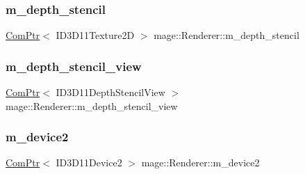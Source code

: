 \subsubsection{\texorpdfstring{m\+\_\+depth\+\_\+stencil}{m\_depth\_stencil}}
{\footnotesize\ttfamily \hyperlink{namespacemage_ae74f374780900893caa5555d1031fd79}{Com\+Ptr}$<$ I\+D3\+D11\+Texture2D $>$ mage\+::\+Renderer\+::m\+\_\+depth\+\_\+stencil\hspace{0.3cm}{\ttfamily [protected]}}

\hypertarget{classmage_1_1_renderer_aaeefc175b9a619f95229a3f8464a7924}{}\label{classmage_1_1_renderer_aaeefc175b9a619f95229a3f8464a7924} 
\subsubsection{\texorpdfstring{m\+\_\+depth\+\_\+stencil\+\_\+view}{m\_depth\_stencil\_view}}
{\footnotesize\ttfamily \hyperlink{namespacemage_ae74f374780900893caa5555d1031fd79}{Com\+Ptr}$<$ I\+D3\+D11\+Depth\+Stencil\+View $>$ mage\+::\+Renderer\+::m\+\_\+depth\+\_\+stencil\+\_\+view\hspace{0.3cm}{\ttfamily [protected]}}

\hypertarget{classmage_1_1_renderer_a6c9757faeb4de815f024dc8eac89960c}{}\label{classmage_1_1_renderer_a6c9757faeb4de815f024dc8eac89960c} 
\subsubsection{\texorpdfstring{m\+\_\+device2}{m\_device2}}
{\footnotesize\ttfamily \hyperlink{namespacemage_ae74f374780900893caa5555d1031fd79}{Com\+Ptr}$<$ I\+D3\+D11\+Device2 $>$ mage\+::\+Renderer\+::m\+\_\+device2\hspace{0.3cm}{\ttfamily [protected]}}

\hypertarget{classmage_1_1_renderer_ab8d5eba948922f5ce1116b067e60bee7}{}\label{classmage_1_1_renderer_ab8d5eba948922f5ce1116b067e60bee7} 
